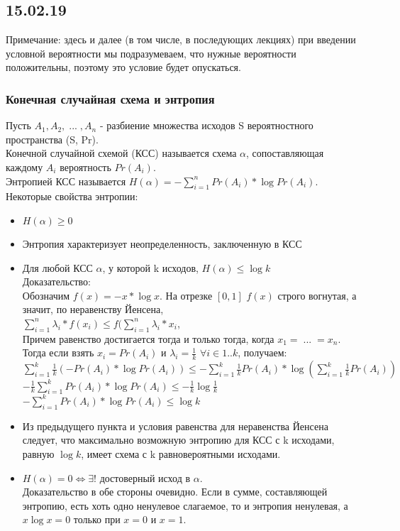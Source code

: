 \subsection{15.02.19}
Примечание: здесь и далее (в том числе, в последующих лекциях) при введении условной вероятности мы подразумеваем, что нужные вероятности положительны, поэтому это условие будет опускаться.
\subsubsection{Конечная случайная схема и энтропия}
Пусть $A_1, A_2, \; ... \; , A_n$ - разбиение множества исходов S вероятностного пространства (S, Pr). \\
Конечной случайной схемой (КСС) называется схема $\alpha$, сопоставляющая каждому $A_i$ вероятность $Pr(A_i)$.\\
Энтропией КСС называется $H(\alpha) = -\sum\limits_{i = 1}^n Pr(A_i) * \log Pr(A_i)$.\\
Некоторые свойства энтропии:\\
\begin{itemize}
\item $H(\alpha) \geq 0$\\
\item Энтропия характеризует неопределенность, заключенную в КСС\\
\item Для любой КСС $\alpha$, у которой k исходов, $H(\alpha) \leq \log k$\\
Доказательство:\\
Обозначим $f(x) = -x * \log x$. На отрезке $[0, 1]$ $f(x)$ строго вогнутая, а значит, по неравенству Йенсена,\\
$\sum\limits_{i = 1}^n \lambda_i * f(x_i) \leq f(\sum\limits_{i = 1}^n \lambda_i * x_i$, \\
Причем равенство достигается тогда и только тогда, когда $x_1 = \; ... \; = x_n$.\\
Тогда если взять $x_i = Pr(A_i)$ и $\lambda_i = \frac{1}{k}$ $\forall i \in 1..k$, получаем:\\
$\sum\limits_{i = 1}^k \frac{1}{k}(-Pr(A_i) * \log Pr(A_i)) \leq -\sum\limits_{i = 1}^k \frac{1}{k}Pr(A_i) * \log (\sum\limits_{i = 1}^k \frac{1}{k}Pr(A_i))$\\
$-\frac{1}{k} \sum\limits_{i = 1}^k Pr(A_i) * \log Pr(A_i) \leq -\frac{1}{k} \log\frac{1}{k}$\\
$-\sum\limits_{i = 1}^k Pr(A_i) * \log Pr(A_i) \leq \log k$\\
\item Из предыдущего пункта и условия равенства для неравенства Йенсена следует, что максимально возможную энтропию для КСС с k исходами, равную $\log k$, имеет схема с k равновероятными исходами.\\
\item $H(\alpha) = 0 \Leftrightarrow \exists!$ достоверный исход в $\alpha$. \\
Доказательство в обе стороны очевидно. Если в сумме, составляющей энтропию, есть хоть одно ненулевое слагаемое, то и энтропия ненулевая, а $x \log x = 0$ только при $x = 0$ и $x = 1$.
\end{itemize}
